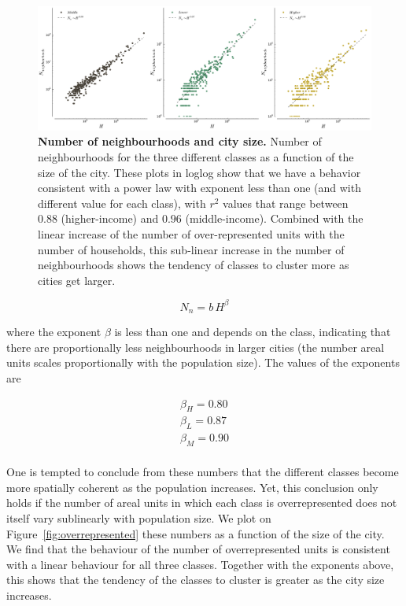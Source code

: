 \begin{figure}
    \centering
    \includegraphics[width=\textwidth]{gfx/chapter-segregation/figure7.pdf}
    \caption{{\bf Number of neighbourhoods and city size.} Number of neighbourhoods for the three different classes as a
    function of the size of the city. These plots in loglog show that
    we have a behavior consistent with a power law with exponent less
    than one (and with different value for each class), with $r^2$ values that
    range between $0.88$ (higher-income) and $0.96$ (middle-income). Combined with the linear
    increase of the number of over-represented units with the number of
    households, this sub-linear increase in the number of neighbourhoods shows the tendency of
classes to cluster more as cities get larger.\label{fig:number_clusters_class}}
\end{figure}

\begin{equation}
    N_n = b\,H^\beta
\end{equation}

where the exponent $\beta$ is less than one and depends on the class, 
indicating that there are proportionally less neighbourhoods
in larger cities (the number areal units scales proportionally with the
population size). The values of the exponents are

\begin{align*}
    \beta_{H} = 0.80\\
    \beta_{L} = 0.87\\
    \beta_{M} = 0.90\\
\end{align*}

One is tempted to conclude from these numbers that the different classes
become more spatially coherent as the population increases. 
Yet, this conclusion only holds if the number of areal units in which each class
is overrepresented does not itself vary sublinearly with population size. We
plot on Figure~\ref{fig:overrepresented} these numbers as a
function of the size of the city. We find that the behaviour of the number of
overrepresented units is consistent with a linear behaviour for all three
classes. Together with the exponents above, this shows that the tendency
of the classes to cluster is greater as the city size increases.

